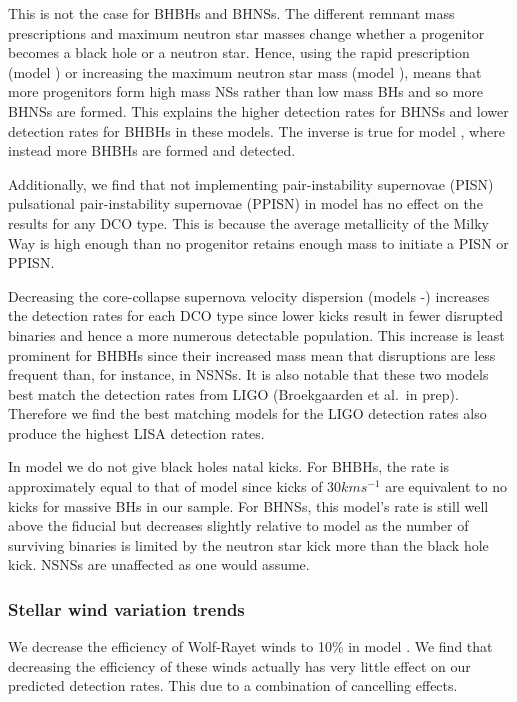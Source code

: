 This is not the case for BHBHs and BHNSs. The different remnant mass prescriptions and maximum neutron star masses change whether a progenitor becomes a black hole or a neutron star. Hence, using the rapid prescription (model \modRapid{}) or increasing the maximum neutron star mass (model \modNSHigh{}), means that more progenitors form high mass NSs rather than low mass BHs and so more BHNSs are formed. This explains the higher detection rates for BHNSs and lower detection rates for BHBHs in these models. The inverse is true for model \modNSLow{}, where instead more BHBHs are formed and detected.

Additionally, we find that not implementing pair-instability supernovae (PISN) pulsational pair-instability supernovae (PPISN) in model \modNoPISN{} has no effect on the results for any DCO type. This is because the average metallicity of the Milky Way is high enough than no progenitor retains enough mass to initiate a PISN or PPISN.

Decreasing the core-collapse supernova velocity dispersion (models \modSigLow{}-\modSigLower{}) increases the detection rates for each DCO type since lower kicks result in fewer disrupted binaries and hence a more numerous detectable population. This increase is least prominent for BHBHs since their increased mass mean that disruptions are less frequent than, for instance, in NSNSs. It is also notable that these two models best match the detection rates from LIGO (Broekgaarden et al.\ in prep). Therefore we find the best matching models for the LIGO detection rates also produce the highest LISA detection rates.

In model \modNoBH{} we do not give black holes natal kicks. For BHBHs, the rate is approximately equal to that of model \modSigLower{} since kicks of $30 \unit{km}{s^{-1}}$ are equivalent to no kicks for massive BHs in our sample. For BHNSs, this model's rate is still well above the fiducial but decreases slightly relative to model \modSigLower{} as the number of surviving binaries is limited by the neutron star kick more than the black hole kick. NSNSs are unaffected as one would assume.

\subsubsection{Stellar wind variation trends}
We decrease the efficiency of Wolf-Rayet winds to 10\% in model \modWRLow{}. We find that decreasing the efficiency of these winds actually has very little effect on our predicted detection rates. This due to a combination of cancelling effects.

